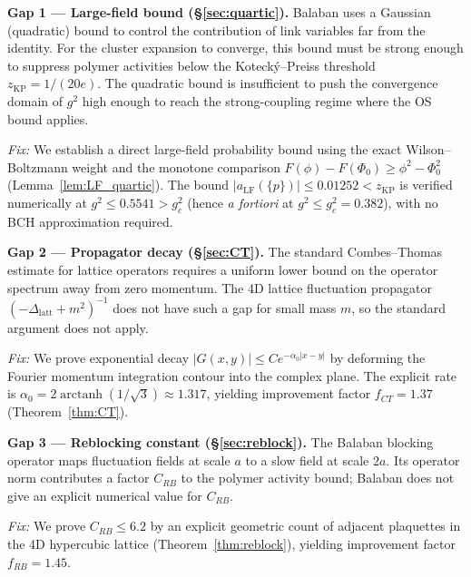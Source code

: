 \documentclass[11pt,a4paper]{amsart}
\theoremstyle{definition}
\newcommand{\zKP}{z_{\mathrm{KP}}}
\begin{document}
\textbf{Gap 1 --- Large-field bound (§\ref{sec:quartic}).}
Balaban uses a Gaussian (quadratic) bound to control the contribution of
link variables far from the identity.  For the cluster expansion to converge,
this bound must be strong enough to suppress polymer activities below the
Koteck\'y--Preiss threshold $z_{\mathrm{KP}} = 1/(20e)$.
The quadratic bound is insufficient to push the convergence domain of $g^2$
high enough to reach the strong-coupling regime where the OS bound applies.

\emph{Fix:} We establish a direct large-field probability bound using
the exact Wilson--Boltzmann weight and the monotone comparison
$F(\phi)-F(\Phi_0)\ge\phi^2-\Phi_0^2$ (Lemma~\ref{lem:LF_quartic}).
The bound $|a_{\mathrm{LF}}(\{p\})|\le 0.01252 < \zKP$ is verified
numerically at $g^2 \le 0.5541 > g^2_c$ (hence \emph{a fortiori} at
$g^2 \le g^2_c = 0.382$), with no BCH approximation required.

\textbf{Gap 2 --- Propagator decay (§\ref{sec:CT}).}
The standard Combes--Thomas estimate for lattice operators requires a uniform
lower bound on the operator spectrum away from zero momentum.  The 4D lattice
fluctuation propagator $(-\Delta_{\mathrm{latt}} + m^2)^{-1}$ does not have
such a gap for small mass $m$, so the standard argument does not apply.

\emph{Fix:} We prove exponential decay $|G(x,y)| \le Ce^{-\alpha_0|x-y|}$
by deforming the Fourier momentum integration contour into the complex plane.
The explicit rate is $\alpha_0 = 2\operatorname{arctanh}(1/\sqrt{3}) \approx 1.317$,
yielding improvement factor $f_{CT} = 1.37$ (Theorem~\ref{thm:CT}).

\textbf{Gap 3 --- Reblocking constant (§\ref{sec:reblock}).}
The Balaban blocking operator maps fluctuation fields at scale $a$ to a
slow field at scale $2a$.  Its operator norm contributes a factor $C_{RB}$
to the polymer activity bound; Balaban does not give an explicit numerical
value for $C_{RB}$.

\emph{Fix:} We prove $C_{RB} \le 6.2$ by an explicit geometric count of
adjacent plaquettes in the 4D hypercubic lattice (Theorem~\ref{thm:reblock}),
yielding improvement factor $f_{RB} = 1.45$.
\end{document}
